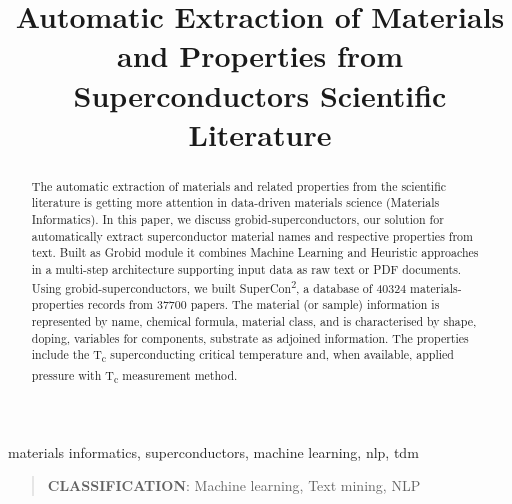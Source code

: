 \documentclass[]{interact}
\theoremstyle{plain}%
\theoremstyle{definition}
\theoremstyle{remark}
\begin{document}

\title{Automatic Extraction of Materials and Properties from Superconductors Scientific Literature}

\author{
}


\maketitle

\begin{abstract}
    The automatic extraction of materials and related properties from the scientific literature is getting more attention in data-driven materials science (Materials Informatics).
    In this paper, we discuss grobid-superconductors, our solution for automatically extract superconductor material names and respective properties from text.
    Built as Grobid module it combines Machine Learning and Heuristic approaches in a multi-step  architecture supporting input data as raw text or PDF documents.
    Using grobid-superconductors, we built SuperCon\textsuperscript{2}, a database of 40324 materials-properties records from 37700 papers.
    The material (or sample) information is represented by name, chemical formula, material class, and is characterised by shape, doping, variables for components, substrate as adjoined information.
    The properties include the T\textsubscript{c} superconducting critical temperature and, when available, applied pressure with T\textsubscript{c} measurement method.
\end{abstract}

\begin{keywords}
    materials informatics, superconductors, machine learning, nlp, tdm
\end{keywords}

\begin{quote}
    \textbf{CLASSIFICATION}: Machine learning, Text mining, NLP
\end{quote}
\end{document}
